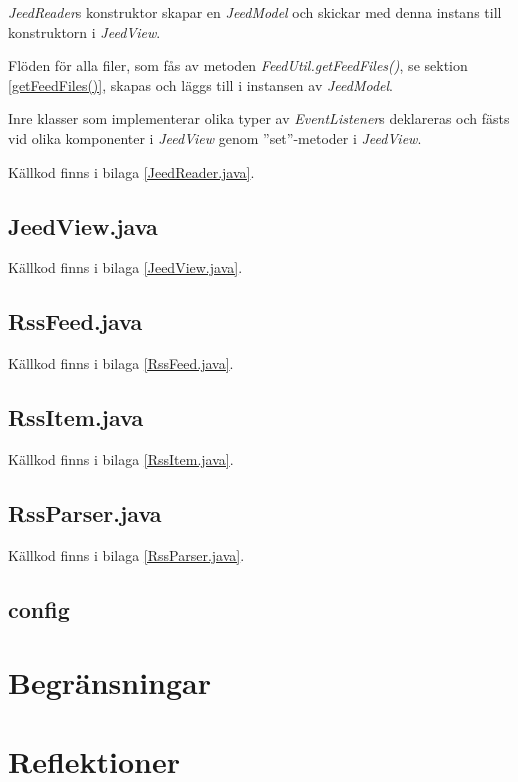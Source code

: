 \documentclass[a4paper, 12pt]{article}
\begin{document}
\textit{JeedReader}s konstruktor skapar en \textit{JeedModel} och
skickar med denna instans till konstruktorn i \textit{JeedView}.

Flöden för alla filer, som fås av metoden
\textit{FeedUtil.getFeedFiles()}, se sektion \ref{getFeedFiles()},
skapas och läggs till i instansen av \textit{JeedModel}.

Inre klasser som implementerar olika typer av \textit{EventListener}s
deklareras och fästs vid olika komponenter i \textit{JeedView} genom
''set''-metoder i \textit{JeedView}.

Källkod finns i bilaga \ref{JeedReader.java}.

\subsection{JeedView.java}\label{JeedView}
Källkod finns i bilaga \ref{JeedView.java}.
\subsection{RssFeed.java}\label{RssFeed}
Källkod finns i bilaga \ref{RssFeed.java}.
\subsection{RssItem.java}\label{RssItem}
Källkod finns i bilaga \ref{RssItem.java}.
\subsection{RssParser.java}\label{RssParser}
Källkod finns i bilaga \ref{RssParser.java}.
\subsection{config}

\section{Begränsningar}\label{Begransningar}

\section{Reflektioner}\label{Reflektioner}
\end{document}
